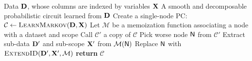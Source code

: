 \begin{algorithm}[t]
  \caption{}\label{alg:idspn}
  \begin{algorithmic}[1]
    \Require Data $\mathbf{D}$, whose columns are indexed by variables $\mathbf{X}$
    \Ensure A smooth and decomposable probabilistic circuit learned from $\mathbf{D}$
    \State Create a single-node PC: $\mathcal{C}\gets\textproc{LearnMarkov}(\set{D},\set{X})$
    \State Let $\mathcal{M}$ be a memoization function associating a node with a dataset and scope
    \State Call $\mathcal{C}'$ a copy of $\mathcal{C}$
      \State Pick worse node $\operatorname{\textup{\textsf{N}}}$ from $\mathcal{C}'$
      \State Extract sub-data $\mathbf{D}'$ and sub-scope $\mathbf{X}'$ from $\mathcal{M}(\operatorname{\textup{\textsf{N}}})$
      \State Replace $\operatorname{\textup{\textsf{N}}}$ with $\textproc{ExtendID}(\set{D}',\set{X}',\mathcal{M})$\label{alg:idspn:line:extend}
    \EndWhile
    \State \textbf{return} $\mathcal{C}$
  \end{algorithmic}
\end{algorithm}

